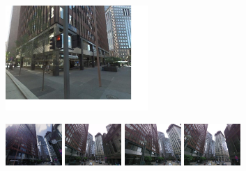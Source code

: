     \begin{figure}[t!]
        \begin{minipage}{1.0\linewidth}
        \end{minipage}
        \begin{minipage}{0.34\linewidth}
            \centering
            \vspace{5mm}
            \includegraphics[height=40mm]{imgs/ex1/query.jpg}
        \end{minipage}
        \begin{minipage}{0.75\linewidth}
            \begin{minipage}{\linewidth} 
                \colorbox{myGreen}{\includegraphics[height=16mm]{imgs/ex1/FVsvm1.jpg}}
                \colorbox{myGreen}{\includegraphics[height=16mm]{imgs/ex1/FVsvm2.jpg}}
                \colorbox{myGreen}{\includegraphics[height=16mm]{imgs/ex1/FVsvm3.jpg}}
                \colorbox{myGreen}{\includegraphics[height=16mm]{imgs/ex1/FVsvm4.jpg}}
            \end{minipage}
            \\
            \begin{minipage}{\linewidth}

\end{minipage}
\end{minipage}
\end{figure}
